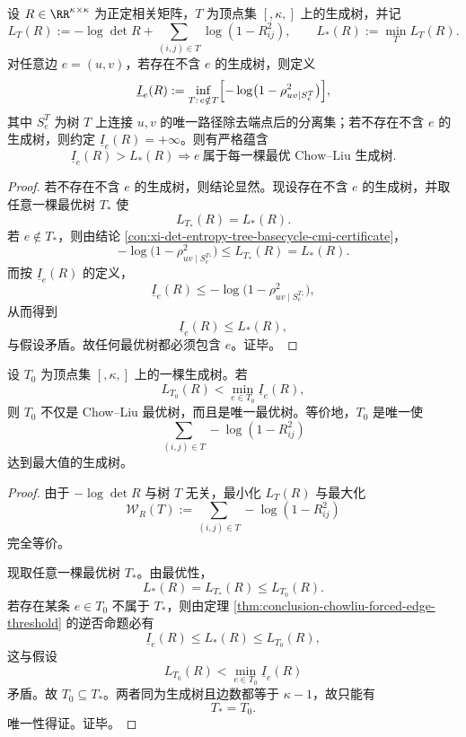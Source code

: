 \begin{theorem}[环熵阈值的强制边判据]\label{thm:conclusion-chowliu-forced-edge-threshold}
设 \(R\in\RR^{\kappa\times\kappa}\) 为正定相关矩阵，\(T\) 为顶点集 \([,\kappa,]\) 上的生成树，并记
\[
L_T(R):=
-\log\det R+\sum_{(i,j)\in T}\log(1-R_{ij}^2),
\qquad
L_\ast(R):=\min_T L_T(R).
\]
对任意边 \(e=(u,v)\)，若存在不含 \(e\) 的生成树，则定义
\[
\underline I_e(R):=
\inf_{T:\,e\notin T}
\Bigl[-\log\bigl(1-\rho_{uv\mid S_e^T}^2\bigr)\Bigr],
\]
其中 \(S_e^T\) 为树 \(T\) 上连接 \(u,v\) 的唯一路径除去端点后的分离集；若不存在不含 \(e\) 的生成树，则约定 \(\underline I_e(R)=+\infty\)。则有严格蕴含
\[
\underline I_e(R)>L_\ast(R)
\Longrightarrow
e\ \text{属于每一棵最优 Chow--Liu 生成树}.
\]
\end{theorem}
\begin{proof}
若不存在不含 \(e\) 的生成树，则结论显然。现设存在不含 \(e\) 的生成树，并取任意一棵最优树 \(T_\ast\) 使
\[
L_{T_\ast}(R)=L_\ast(R).
\]
若 \(e\notin T_\ast\)，则由结论 \ref{con:xi-det-entropy-tree-basecycle-cmi-certificate}，
\[
-\log\bigl(1-\rho_{uv\mid S_e^{T_\ast}}^2\bigr)\le L_{T_\ast}(R)=L_\ast(R).
\]
而按 \(\underline I_e(R)\) 的定义，
\[
\underline I_e(R)\le -\log\bigl(1-\rho_{uv\mid S_e^{T_\ast}}^2\bigr),
\]
从而得到
\[
\underline I_e(R)\le L_\ast(R),
\]
与假设矛盾。故任何最优树都必须包含 \(e\)。证毕。
\end{proof}

\begin{theorem}[超临界骨架的唯一树判据]\label{thm:conclusion-chowliu-unique-tree-threshold}
设 \(T_0\) 为顶点集 \([,\kappa,]\) 上的一棵生成树。若
\[
L_{T_0}(R)<\min_{e\in T_0}\underline I_e(R),
\]
则 \(T_0\) 不仅是 Chow--Liu 最优树，而且是唯一最优树。等价地，\(T_0\) 是唯一使
\[
\sum_{(i,j)\in T}-\log(1-R_{ij}^2)
\]
达到最大值的生成树。
\end{theorem}
\begin{proof}
由于 \(-\log\det R\) 与树 \(T\) 无关，最小化 \(L_T(R)\) 与最大化
\[
\mathcal W_R(T):=\sum_{(i,j)\in T}-\log(1-R_{ij}^2)
\]
完全等价。

现取任意一棵最优树 \(T_\ast\)。由最优性，
\[
L_\ast(R)=L_{T_\ast}(R)\le L_{T_0}(R).
\]
若存在某条 \(e\in T_0\) 不属于 \(T_\ast\)，则由定理
\ref{thm:conclusion-chowliu-forced-edge-threshold} 的逆否命题必有
\[
\underline I_e(R)\le L_\ast(R)\le L_{T_0}(R),
\]
这与假设
\[
L_{T_0}(R)<\min_{e\in T_0}\underline I_e(R)
\]
矛盾。故 \(T_0\subseteq T_\ast\)。两者同为生成树且边数都等于 \(\kappa-1\)，故只能有
\[
T_\ast=T_0.
\]
唯一性得证。证毕。
\end{proof}

